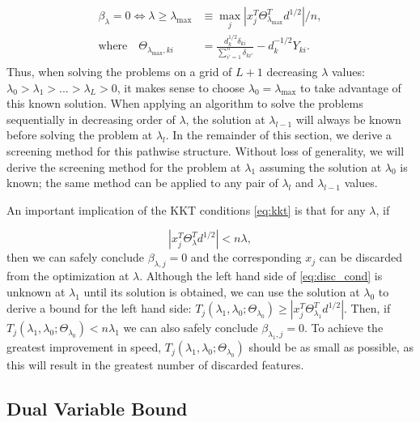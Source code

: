 \begin{gather}
    \label{eq:lammax}
    \begin{aligned}
        \beta_\lambda=0\iff \lambda \geq \lambda_{\max}&\equiv \max_j \left|x_j^T\Theta^T_{\lambda_{\max}}d^{1/2}\right|/n,\\
        \textrm{where}\quad\Theta_{\lambda_{\max},ki}&=\frac{d_k^{1/2}\delta_{ki}}{\sum_{i'=1}^n\delta_{ki'}}-d_k^{-1/2}Y_{ki}.
    \end{aligned}
\end{gather}
Thus, when solving the problems on a grid of $L+1$ decreasing $\lambda$ values: $\lambda_0>\lambda_1>...>\lambda_L>0$, it makes sense to choose $\lambda_0= \lambda_{\max}$ to take advantage of this known solution. When applying an algorithm to solve the problems sequentially in decreasing order of $\lambda$, the solution at $\lambda_{l-1}$ will always be known before solving the problem at $\lambda_l$. In the remainder of this section, we derive a screening method for this pathwise structure. Without loss of generality, we will derive the screening method for the problem at $\lambda_1$ assuming the solution at $\lambda_0$ is known; the same method can be applied to any pair of $\lambda_{l}$ and $\lambda_{l-1}$ values.

An important implication of the KKT conditions \eqref{eq:kkt} is that for any $\lambda$, if 

\begin{equation}
    \label{eq:disc_cond}
    |x_j^T\Theta_{\lambda}^Td^{1/2}|<n\lambda,
\end{equation}
then we can safely conclude $\beta_{\lambda,j}=0$ and the corresponding $x_j$ can be discarded from the optimization at $\lambda$. Although the left hand side of \eqref{eq:disc_cond} is unknown at $\lambda_1$ until its solution is obtained, we can use the solution at $\lambda_{0}$ to derive a bound for the left hand side: $T_j(\lambda_{1},\lambda_{0};\Theta_{\lambda_0})\geq |x_j^T\Theta_{\lambda_1}^Td^{1/2}|$. Then, if $T_j(\lambda_{1},\lambda_{0};\Theta_{\lambda_0})<n\lambda_1$ we can also safely conclude $\beta_{\lambda_1,j}=0$. To achieve the greatest improvement in speed, $T_j(\lambda_{1},\lambda_{0};\Theta_{\lambda_0})$ should be as small as possible, as this will result in the greatest number of discarded features.

\subsection{Dual Variable Bound}

